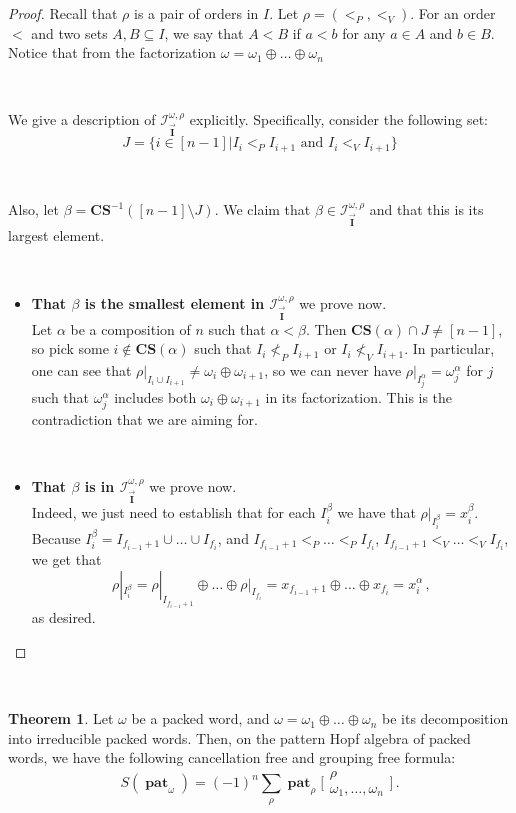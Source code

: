 \documentclass[12pt, reqno]{amsart}
\theoremstyle{definition}
\newtheorem{thm}{Theorem}[section]
\newcommand{\III}{\vec{\mathbf{I}}}
\DeclareMathOperator{\pat}{\mathbf{pat}}
\begin{document}
\begin{proof}
Recall that $\rho$ is a pair of orders in $I$.
Let $\rho = (<_P, <_V)$.
For an order $<$ and two sets $A, B \subseteq I$, we say that $A < B$ if $a < b$ for any $a \in A$ and $b \in B$.
Notice that from the factorization $\omega = \omega_1 \oplus \dots \oplus \omega_n$

\

We give a description of $\mathcal I^{\omega, \rho}_{\III}$ explicitly.
Specifically, consider the following set:
$$J = \{i \in [n-1] | I_i <_P I_{i+1} \text{ and } I_i <_V I_{i+1} \}$$

\

Also, let $\beta = \mathbf{CS}^{-1}([n-1]\setminus J)$. We claim that $\beta \in \mathcal I^{\omega, \rho}_{\III}$ and that this is its largest element.

\
\begin{itemize}
    \item {\bf That $\beta$ is the smallest element in $\mathcal I^{\omega, \rho}_{\III}$} we prove now. \\
Let $\alpha $ be a composition of $n$ such that $\alpha < \beta$. Then $\mathbf{CS}(\alpha)\cap J \neq [n-1]$, so pick some $i \not \in\mathbf{CS}(\alpha)$ such that $ I_i \not <_P I_{i+1} \text{ or } I_i \not<_V I_{i+1} $.
In particular, one can see that $\rho|_{I_i \cup I_{i+1}} \neq \omega_i \oplus \omega_{i+1}$, so we can never have $\rho|_{I^{\alpha}_j} = \omega^{\alpha}_j$ for $j$ such that $\omega^{\alpha}_j$ includes both $\omega_i \oplus \omega_{i+1}$ in its factorization.
This is the contradiction that we are aiming for.

\

\item {\bf That $\beta$ is in $\mathcal I^{\omega, \rho}_{\III}$} we prove now.\\
Indeed, we just need to establish that for each $I^{\beta}_i$ we have that $\rho|_{I^{\beta}_i} = x^{\beta}_i$.
Because $I^{\beta}_i = I_{f_{i-1} + 1} \cup \dots \cup I_{f_i}$, and $I_{f_{i-1} + 1} <_P \dots <_P I_{f_i}$, $I_{f_{i-1} + 1} <_V \dots <_V I_{f_i}$, we get that 
$$\rho|_{I^{\beta}_i} = \rho|_{I_{f_{i-1} + 1}} \oplus \dots \oplus \rho|_{I_{f_i}} = x_{f_{i-1} + 1} \oplus \dots\oplus x_{f_i} = x^{\alpha}_i\,  ,$$
as desired.
\end{itemize}
\end{proof}

\

\begin{thm}\label{thm:antipode_packed}
Let $\omega $ be a packed word, and $\omega = \omega_1 \oplus \dots \oplus \omega_n$ be its decomposition into irreducible packed words.
Then, on the pattern Hopf algebra of packed words, we have the following cancellation free and grouping free formula:
$$S(\pat_{\omega}) = (-1)^n  \sum_{\rho} \pat_{\rho} \bigl[\!\begin{smallmatrix} \rho  \\ \omega_1, \dots, \omega_n \end{smallmatrix}\!\bigr] \, .$$
\end{thm}
\end{document}

